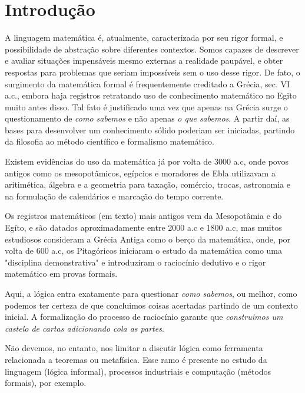 \chapter{Introdução}
A linguagem matemática é, atualmente, caracterizada por seu rigor formal, e possibilidade de abstração sobre diferentes contextos. Somos capazes de descrever e avaliar situações impensáveis mesmo externas a realidade paupável, e obter respostas para problemas que seriam impossíveis sem o uso desse rigor. De fato, o surgimento da matemática formal é frequentemente creditado a Grécia, sec. VI a.c., embora haja registros retratando uso de conhecimento matemático no Egito muito antes disso. Tal fato é justificado uma vez que apenas na Grécia surge o questionamento de \textit{como sabemos} e não apenas \textit{o que sabemos}. A partir daí, as bases para desenvolver um conhecimento sólido poderiam ser iniciadas, partindo da filosofia ao método científico e formalismo matemático.


Existem evidências do uso da matemática já por volta de 3000 a.c, onde povos antigos como os mesopotâmicos, egípcios e moradores de Ebla utilizavam a aritimética, álgebra e a geometria para taxação, comércio, trocas, astronomia e na formulação de calendários e marcação do tempo corrente.

Os registros matemáticos (em texto) mais antigos vem da Mesopotâmia e do Egíto, e são datados aproximadamente entre 2000 a.c e 1800 a.c, mas muitos estudiosos consideram a Grécia Antiga como o berço da matemática, onde, por volta de 600 a.c, os Pitagóricos iniciaram o estudo da matemática como uma "disciplina demonstrativa" e introduziram o raciocínio dedutivo e o rigor matemático em provas formais.


Aqui, a lógica entra exatamente para questionar \textit{como sabemos}, ou melhor, como podemos ter certeza de que concluimos coisas acertadas partindo de um contexto inicial. A formalização do processo de raciocínio garante que \textit{construimos um castelo de cartas adicionando cola as partes}.

Não devemos, no entanto, nos limitar a discutir lógica como ferramenta relacionada a teoremas ou metafísica. Esse ramo é presente no estudo da linguagem (lógica informal), processos industriais e computação (métodos formais), por exemplo. %

